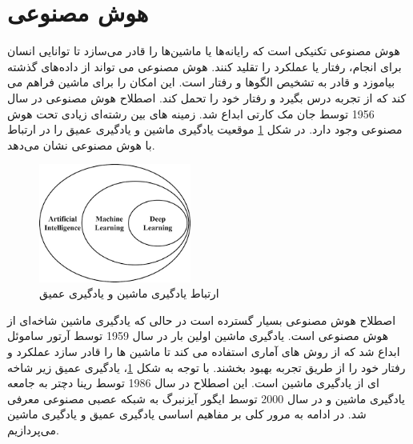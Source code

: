 \section{هوش مصنوعی}
هوش مصنوعی تکنیکی است که رایانه‌ها یا ماشین‌ها را قادر می‌سازد تا توانایی انسان برای انجام، رفتار یا عملکرد را تقلید کنند. هوش مصنوعی می تواند از داده‌های گذشته بیاموزد و قادر به تشخیص الگوها و رفتار است. این امکان را برای ماشین فراهم می کند که از تجربه درس بگیرد و رفتار خود را تحمل کند. اصطلاح هوش مصنوعی در سال 1956 توسط جان مک کارتی
 ابداع شد. زمینه های بین رشته‌ای زیادی تحت هوش مصنوعی وجود دارد. در شکل
 \ref{exp_ai_ml}
 موقعیت یادگیری ماشین
  و یادگیری عمیق
   را در ارتباط با هوش مصنوعی نشان می‌دهد.
 
 \begin{figure}[H]
 	\centering
 	\includegraphics[width=5cm]{Example of AI and ML.png}
 	\caption{ارتباط یادگیری ماشین و یادگیری عمیق}
 	\label{exp_ai_ml}
 \end{figure}
اصطلاح هوش مصنوعی بسیار گسترده است در حالی که یادگیری ماشین شاخه‌ای از هوش مصنوعی است. یادگیری ماشین اولین بار در سال 1959 توسط آرتور ساموئل ابداع شد که از روش های آماری استفاده می کند تا ماشین ها را قادر سازد عملکرد و رفتار خود را از طریق تجربه بهبود بخشند. با توجه به شکل \ref{exp_ai_ml}، یادگیری عمیق زیر شاخه ای از یادگیری ماشین است. این اصطلاح در سال 1986 توسط رینا دچتر به جامعه یادگیری ماشین و در سال 2000 توسط ایگور آیزنبرگ به شبکه عصبی مصنوعی معرفی شد.
\cite{alaskar2021machine}
در ادامه به مرور کلی بر مفاهیم اساسی یادگیری عمیق و یادگیری ماشین می‌پردازیم.
%